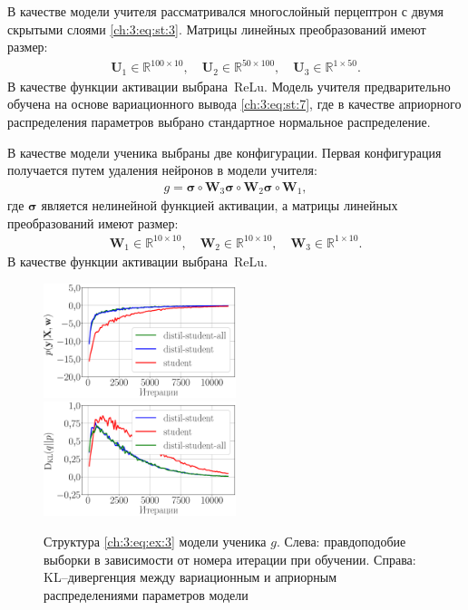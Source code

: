 В качестве модели учителя рассматривался многослойный перцептрон с двумя скрытыми слоями \eqref{ch:3:eq:st:3}. Матрицы линейных преобразований имеют размер:
\[
\label{ch:3:eq:ex:2}
\begin{aligned}
\mathbf{U}_{1} \in \mathbb{R}^{100 \times 10}, \quad \mathbf{U}_{2} \in \mathbb{R}^{50 \times 100}, \quad \mathbf{U}_{3} \in \mathbb{R}^{1 \times 50}.
\end{aligned}
\]
В качестве функции активации выбрана~$\text{ReLu}$.
Модель учителя предварительно обучена на основе вариационного вывода \eqref{ch:3:eq:st:7}, где в качестве априорного распределения параметров выбрано стандартное нормальное распределение.

В качестве модели ученика выбраны две конфигурации. Первая конфигурация получается путем удаления нейронов в модели учителя:
\[
\label{ch:3:eq:ex:3}
\begin{aligned}
g = \bm{\sigma} \circ \mathbf{W}_3\bm{\sigma} \circ \mathbf{W}_2\bm{\sigma} \circ \mathbf{W}_1,
\end{aligned}
\]
где $\bm{\sigma}$ является нелинейной функцией активации, а матрицы линейных преобразований имеют размер:
\[
\label{ch:3:eq:ex:4}
\begin{aligned}
\mathbf{W}_{1} \in \mathbb{R}^{10 \times 10}, \quad \mathbf{W}_{2} \in \mathbb{R}^{10 \times 10},  \quad \mathbf{W}_{3} \in \mathbb{R}^{1 \times 10}.
\end{aligned}
\]
В качестве функции активации выбрана~$\text{ReLu}$.

\begin{figure}[!ht]
\includegraphics[width=0.5\textwidth]{results/bayesdistil/synthetic_likelihood_3_layers.eps}
\includegraphics[width=0.5\textwidth]{results/bayesdistil/synthetic_D_KL_3_layers.eps}
\caption{Структура \eqref{ch:3:eq:ex:3} модели ученика $g$. Слева: правдоподобие выборки в зависимости от номера итерации при обучении. Справа: KL--дивергенция между вариационным и априорным распределениями параметров модели}
\label{ch:3:exp:fig1}
\end{figure}


